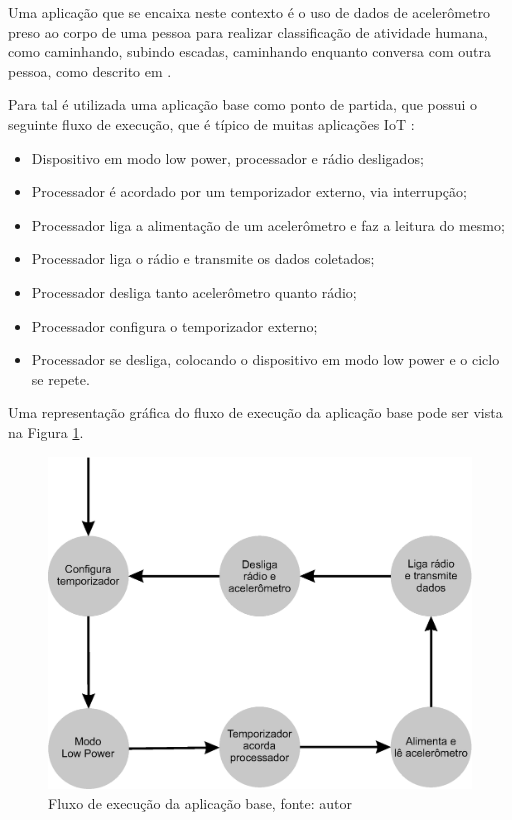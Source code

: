 \documentclass[a5paper]{ufsc-thesis}  %
\begin{document}
Uma aplicação que se encaixa neste contexto é o uso de dados de acelerômetro preso ao corpo de uma pessoa para realizar classificação de atividade humana, como caminhando, subindo escadas, caminhando enquanto conversa com outra pessoa, como descrito em \cite{hyerarchical_ML}.

Para tal é utilizada uma aplicação base como ponto de partida, que possui o seguinte fluxo de execução, que é típico de muitas aplicações IoT \cite{survey_ml_for_iot}:
\begin{itemize}
    \itemsep-0.5em
    \item Dispositivo em modo low power, processador e rádio desligados;
    \item Processador é acordado por um temporizador externo, via interrupção;
    \item Processador liga a alimentação de um acelerômetro e faz a leitura do mesmo;
    \item Processador liga o rádio e transmite os dados coletados;
    \item Processador desliga tanto acelerômetro quanto rádio;
    \item Processador configura o temporizador externo;
    \item Processador se desliga, colocando o dispositivo em modo low power e o ciclo se repete.
\end{itemize}

Uma representação gráfica do fluxo de execução da aplicação base pode ser vista na Figura \ref{fig:base_app}.
\begin{figure}[!ht]
    \centering
    \includegraphics[width=0.8\linewidth]{imagens/base_app.eps}
    \caption{Fluxo de execução da aplicação base, fonte: autor}
    \label{fig:base_app}
\end{figure}
\end{document}
